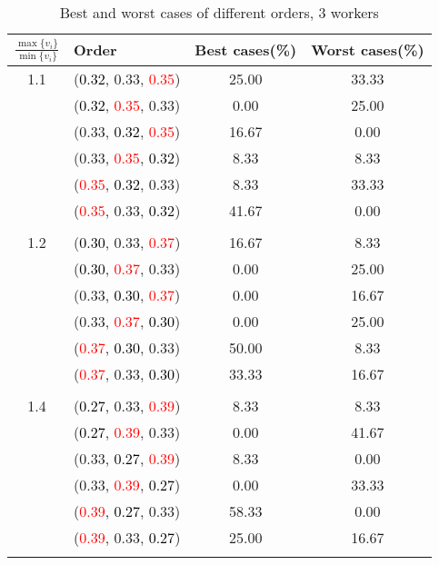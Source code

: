 \documentclass[10pt,a4paper]{report}
\begin{document}
\newpage\begin{center}
	\small
	\begin{longtable}{clcc}
		\caption{Best and worst cases of different orders, 3 workers}\\
		\toprule
		\setlength{\tabcolsep}{1mm}
		\renewcommand\baselinestretch{0.5}\selectfont
		$\frac{\max\{v_i\}}{\min\{v_i\}}$ & Order & Best cases(\%) & Worst cases(\%) \\
			\midrule		1.1			&(\textcolor{black}{0.32}, 0.33, \textcolor{red}{0.35})&25.00&33.33\\
			&(\textcolor{black}{0.32}, \textcolor{red}{0.35}, 0.33)&0.00&25.00\\
			&(0.33, \textcolor{black}{0.32}, \textcolor{red}{0.35})&16.67&0.00\\
			&(0.33, \textcolor{red}{0.35}, \textcolor{black}{0.32})&8.33&8.33\\
			&(\textcolor{red}{0.35}, \textcolor{black}{0.32}, 0.33)&8.33&33.33\\
			&(\textcolor{red}{0.35}, 0.33, \textcolor{black}{0.32})&41.67&0.00\\
		&&&\\
		1.2			&(\textcolor{black}{0.30}, 0.33, \textcolor{red}{0.37})&16.67&8.33\\
			&(\textcolor{black}{0.30}, \textcolor{red}{0.37}, 0.33)&0.00&25.00\\
			&(0.33, \textcolor{black}{0.30}, \textcolor{red}{0.37})&0.00&16.67\\
			&(0.33, \textcolor{red}{0.37}, \textcolor{black}{0.30})&0.00&25.00\\
			&(\textcolor{red}{0.37}, \textcolor{black}{0.30}, 0.33)&50.00&8.33\\
			&(\textcolor{red}{0.37}, 0.33, \textcolor{black}{0.30})&33.33&16.67\\
		&&&\\
		1.4			&(\textcolor{black}{0.27}, 0.33, \textcolor{red}{0.39})&8.33&8.33\\
			&(\textcolor{black}{0.27}, \textcolor{red}{0.39}, 0.33)&0.00&41.67\\
			&(0.33, \textcolor{black}{0.27}, \textcolor{red}{0.39})&8.33&0.00\\
			&(0.33, \textcolor{red}{0.39}, \textcolor{black}{0.27})&0.00&33.33\\
			&(\textcolor{red}{0.39}, \textcolor{black}{0.27}, 0.33)&58.33&0.00\\
			&(\textcolor{red}{0.39}, 0.33, \textcolor{black}{0.27})&25.00&16.67\\
		&&&\\

\end{longtable}
\end{center}
\end{document}
